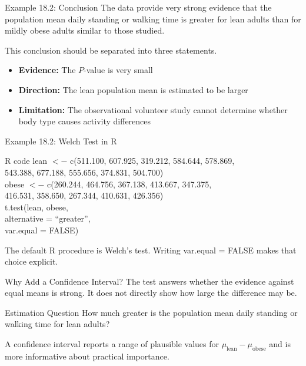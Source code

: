 \documentclass[aspectratio=169,10pt]{beamer}
\begin{document}
\begin{frame}{Example 18.2: Conclusion}
The data provide very strong evidence that the population mean daily standing or walking time is greater for lean adults than for mildly obese adults similar to those studied.

\vspace{0.25cm}
This conclusion should be separated into three statements.

\begin{itemize}
  \item \textbf{Evidence:} The $P$-value is very small
  \item \textbf{Direction:} The lean population mean is estimated to be larger
  \item \textbf{Limitation:} The observational volunteer study cannot determine whether body type causes activity differences
\end{itemize}
\end{frame}

\begin{frame}{Example 18.2: Welch Test in R}
\begin{block}{R code}
\scriptsize\sffamily
lean $<-$ c(511.100, 607.925, 319.212, 584.644, 578.869, \\
\hspace*{1.55cm}543.388, 677.188, 555.656, 374.831, 504.700) \\
\vspace{0.08cm}
obese $<-$ c(260.244, 464.756, 367.138, 413.667, 347.375, \\
\hspace*{1.55cm}416.531, 358.650, 267.344, 410.631, 426.356) \\
\vspace{0.08cm}
t.test(lean, obese, \\
\hspace*{1.1cm}alternative = ``greater'', \\
\hspace*{1.1cm}var.equal = FALSE)
\end{block}

The default R procedure is Welch's test. Writing \textsf{var.equal = FALSE} makes that choice explicit.
\end{frame}

\begin{frame}{Why Add a Confidence Interval?}
The test answers whether the evidence against equal means is strong. It does not directly show how large the difference may be.

\begin{block}{Estimation Question}
How much greater is the population mean daily standing or walking time for lean adults?
\end{block}

A confidence interval reports a range of plausible values for $\mu_{\text{lean}}-\mu_{\text{obese}}$ and is more informative about practical importance.
\end{frame}
\end{document}

